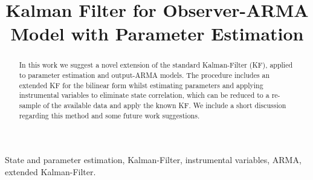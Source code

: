 \documentclass[conference]{IEEEtran}
\begin{document}
\title{Kalman Filter for Observer-ARMA Model with Parameter Estimation\\}

\author{
\and
{}
}

\maketitle

\begin{abstract}
In this work we suggest a novel extension of the standard Kalman-Filter (KF), applied to parameter estimation and output-ARMA models. The procedure includes an extended KF for the bilinear form whilst estimating parameters and applying instrumental variables to eliminate state correlation, which can be reduced to a re-sample of the available data and apply the known KF. We include a short discussion regarding this method and some future work suggestions.
\end{abstract}

\begin{IEEEkeywords}
  State and parameter estimation, Kalman-Filter, instrumental variables, ARMA, extended Kalman-Filter.
\end{IEEEkeywords}






\end{document}
